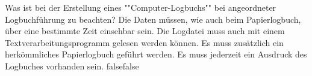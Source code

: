     {Was ist bei der Erstellung eines ""Computer-Logbuchs"" bei angeordneter Logbuchführung zu beachten?}
    {Die Daten müssen, wie auch beim Papierlogbuch, über eine bestimmte Zeit einsehbar sein.}
    {Die Logdatei muss auch mit einem Textverarbeitungsprogramm gelesen werden können.}
    {Es muss zusätzlich ein herkömmliches Papierlogbuch geführt werden.}
    {Es muss jederzeit ein Ausdruck des Logbuches vorhanden sein.}
    {false}{false}